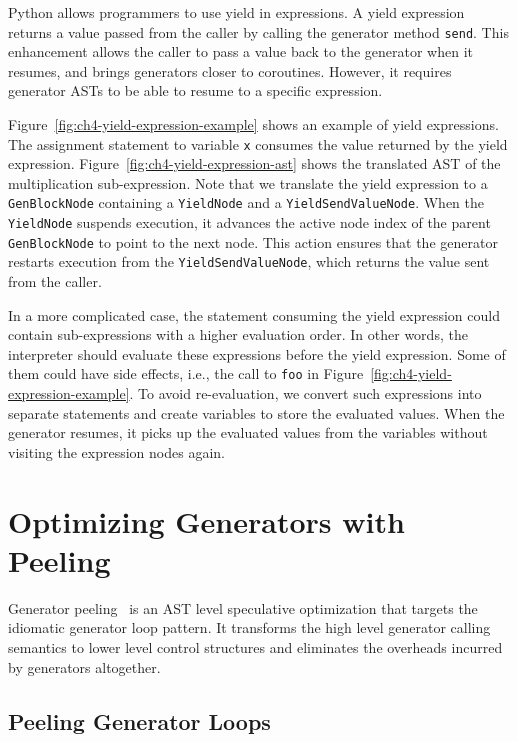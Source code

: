 Python allows programmers to use yield in expressions.
A yield expression returns a value passed from the caller by calling the generator method \texttt{send}.
This enhancement allows the caller to pass a value back to the generator when it resumes, and brings generators closer to coroutines.
However, it requires generator ASTs to be able to resume to a specific expression.

Figure~\ref{fig:ch4-yield-expression-example} shows an example of yield expressions.
The assignment statement to variable \texttt{x} consumes the value returned by the yield expression.
Figure~\ref{fig:ch4-yield-expression-ast} shows the translated AST of the multiplication sub-expression.
Note that we translate the yield expression to a \texttt{GenBlockNode} containing a \texttt{YieldNode} and a \texttt{YieldSendValueNode}.
When the \texttt{YieldNode} suspends execution, it advances the active node index of the parent \texttt{GenBlockNode} to point to the next node.
This action ensures that the generator restarts execution from the \texttt{YieldSendValueNode}, which returns the value sent from the caller.

In a more complicated case, the statement consuming the yield expression could contain sub-expressions with a higher evaluation order.
In other words, the interpreter should evaluate these expressions before the yield expression.
Some of them could have side effects, i.e., the call to \texttt{foo} in Figure~\ref{fig:ch4-yield-expression-example}.
To avoid re-evaluation, we convert such expressions into separate statements and create variables to store the evaluated values.
When the generator resumes, it picks up the evaluated values from the variables without visiting the expression nodes again.

\section{Optimizing Generators with Peeling}
\label{sec:ch4-generaor-peeling}

Generator peeling~\cite{Zhang+2014} is an AST level speculative optimization that targets the idiomatic generator loop pattern.
It transforms the high level generator calling semantics to lower level control structures and eliminates the overheads incurred by generators altogether.

\subsection{Peeling Generator Loops}

